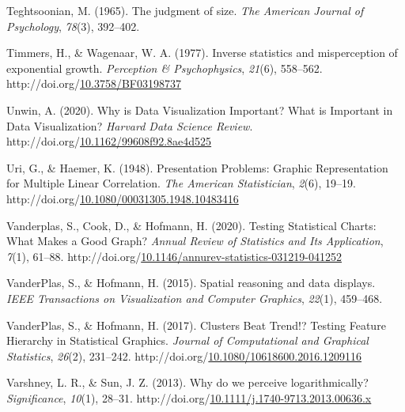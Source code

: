 \documentclass[print]{nuthesis}
\newlength{\cslhangindent}
\newenvironment{CSLReferences}%
{\setlength{\parindent}{0pt}%
\everypar{\setlength{\hangindent}{\cslhangindent}}\ignorespaces}%
{\par}
\begin{document}
\begin{CSLReferences}{1}{0}
\leavevmode\hypertarget{ref-teghtsoonian1965judgment}{}%
Teghtsoonian, M. (1965). The judgment of size. \emph{The American Journal of Psychology}, \emph{78}(3), 392--402.

\leavevmode\hypertarget{ref-timmers_inverse_1977}{}%
Timmers, H., \& Wagenaar, W. A. (1977). Inverse statistics and misperception of exponential growth. \emph{Perception \& Psychophysics}, \emph{21}(6), 558--562. http://doi.org/\href{https://doi.org/10.3758/BF03198737}{10.3758/BF03198737}

\leavevmode\hypertarget{ref-unwin_why_2020}{}%
Unwin, A. (2020). Why is {Data} {Visualization} {Important}? {What} is {Important} in {Data} {Visualization}? \emph{Harvard Data Science Review}. http://doi.org/\href{https://doi.org/10.1162/99608f92.8ae4d525}{10.1162/99608f92.8ae4d525}

\leavevmode\hypertarget{ref-uri_presentation_1948}{}%
Uri, G., \& Haemer, K. (1948). Presentation {Problems}: {Graphic} {Representation} for {Multiple} {Linear} {Correlation}. \emph{The American Statistician}, \emph{2}(6), 19--19. http://doi.org/\href{https://doi.org/10.1080/00031305.1948.10483416}{10.1080/00031305.1948.10483416}

\leavevmode\hypertarget{ref-vanderplas_testing_2020}{}%
Vanderplas, S., Cook, D., \& Hofmann, H. (2020). Testing {Statistical} {Charts}: {What} {Makes} a {Good} {Graph}? \emph{Annual Review of Statistics and Its Application}, \emph{7}(1), 61--88. http://doi.org/\href{https://doi.org/10.1146/annurev-statistics-031219-041252}{10.1146/annurev-statistics-031219-041252}

\leavevmode\hypertarget{ref-vanderplas2015spatial}{}%
VanderPlas, S., \& Hofmann, H. (2015). Spatial reasoning and data displays. \emph{IEEE Transactions on Visualization and Computer Graphics}, \emph{22}(1), 459--468.

\leavevmode\hypertarget{ref-vanderplas_clusters_2017}{}%
VanderPlas, S., \& Hofmann, H. (2017). Clusters {Beat} {Trend}!? {Testing} {Feature} {Hierarchy} in {Statistical} {Graphics}. \emph{Journal of Computational and Graphical Statistics}, \emph{26}(2), 231--242. http://doi.org/\href{https://doi.org/10.1080/10618600.2016.1209116}{10.1080/10618600.2016.1209116}

\leavevmode\hypertarget{ref-varshney_why_2013}{}%
Varshney, L. R., \& Sun, J. Z. (2013). Why do we perceive logarithmically? \emph{Significance}, \emph{10}(1), 28--31. http://doi.org/\href{https://doi.org/10.1111/j.1740-9713.2013.00636.x}{10.1111/j.1740-9713.2013.00636.x}


\end{CSLReferences}
\end{document}
